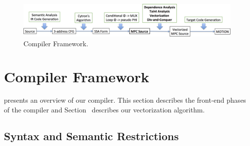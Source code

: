 
\begin{figure}
  \includegraphics[width=1.0\linewidth]{figs_paper_SIMD/compiler_framework.png}
  \caption{Compiler Framework. }
  \label{fig:compiler_framework}
\end{figure}

\section{\bf Compiler Framework}
\label{sec:compiler}



 presents an overview of our compiler. This section describes the front-end phases of the compiler
and Section~ describes our vectorization algorithm. 

\subsection{Syntax and Semantic Restrictions}
\label{sec:syntax}

